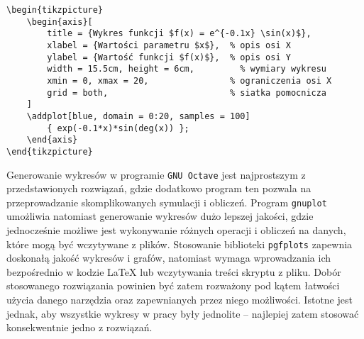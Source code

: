 \begin{listing}[ht!]
\begin{verbatim}
\begin{tikzpicture}
	\begin{axis}[
		title = {Wykres funkcji $f(x) = e^{-0.1x} \sin(x)$},
		xlabel = {Wartości parametru $x$},  % opis osi X
		ylabel = {Wartość funkcji $f(x)$},  % opis osi Y
		width = 15.5cm, height = 6cm,         % wymiary wykresu
		xmin = 0, xmax = 20,                % ograniczenia osi X
		grid = both,                        % siatka pomocnicza
	]
	\addplot[blue, domain = 0:20, samples = 100]
		{ exp(-0.1*x)*sin(deg(x)) };
	\end{axis}
\end{tikzpicture}
\end{verbatim}
\end{listing}

Generowanie wykresów w programie \texttt{GNU Octave} jest najprostszym z przedstawionych rozwiązań, gdzie dodatkowo program ten pozwala na przeprowadzanie skomplikowanych symulacji i obliczeń. Program \texttt{gnuplot} umożliwia natomiast generowanie wykresów dużo lepszej jakości, gdzie jednocześnie możliwe jest wykonywanie różnych operacji i obliczeń na danych, które mogą być wczytywane z plików. Stosowanie biblioteki \texttt{pgfplots} zapewnia doskonałą jakość wykresów i grafów, natomiast wymaga wprowadzania ich bezpośrednio w kodzie \LaTeX{} lub wczytywania treści skryptu z pliku. Dobór stosowanego rozwiązania powinien być zatem rozważony pod kątem łatwości użycia danego narzędzia oraz zapewnianych przez niego możliwości. Istotne jest jednak, aby wszystkie wykresy w pracy były jednolite -- najlepiej zatem stosować konsekwentnie jedno z rozwiązań.
